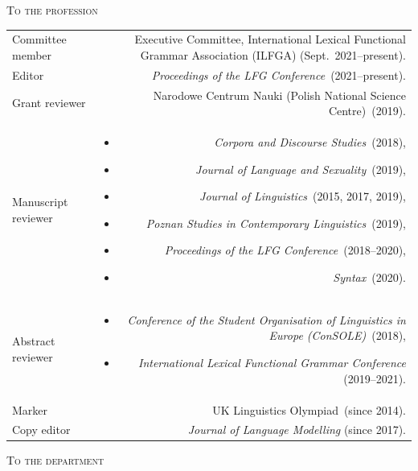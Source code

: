\documentclass[11pt,a4paper]{article}
\makeatletter
\newlength{\rulelength}%
\newenvironment{cvsection}{%
  \setlength{\extrarowheight}{0.70ex}
  \begin{longtable}[l]{@{} L R @{}}
}{%
  \end{longtable}
}
\newlength{\squish}
\newenvironment{reviewlist}
{%
\vspace*{\squish}%
\begin{itemize}[noitemsep,label={},nosep,left=0pt .. \parindent]%
}
{%
\end{itemize}
}
\newcommand{\Label}[1]{%
\textnormal{#1}%
}
\newcommand{\cvsubhead}[1]{\noindent\hspace*{\rulelength}\hspace*{9pt} \textsc{#1}\vspace*{0.25\baselineskip}}
\makeatother
\begin{document}
\cvsubhead{To the profession}
\begin{cvsection}
  \Label{Committee member} & Executive Committee, International Lexical Functional Grammar Association (ILFGA) (Sept.~2021--present).\\
  \Label{Editor} & \textit{Proceedings of the LFG Conference}~(2021--present).\\
\Label{Grant reviewer} &
                    Narodowe Centrum Nauki (Polish National Science Centre)~(2019).\\
\Label{Manuscript reviewer} &
                \begin{reviewlist}
                \item \textit{Corpora and Discourse Studies}~(2018),
                \item \textit{Journal of Language and Sexuality}~(2019),
                \item \textit{Journal of Linguistics}~(2015, 2017, 2019),
                \item \textit{Poznan Studies in Contemporary Linguistics}~(2019),
                \item \textit{Proceedings of the LFG Conference}~(2018--2020),
                \item  \textit{Syntax}~(2020).
                \end{reviewlist}
                 \\[\squish]
\Label{Abstract reviewer}   &
                \begin{reviewlist}
                \item \textit{Conference of the Student Organisation of Linguistics in Europe (ConSOLE)}~(2018),
                \item \textit{International Lexical Functional Grammar Conference} (2019--2021).
                \end{reviewlist}
                \\[\squish]
\Label{Marker}      & UK Linguistics Olympiad~(since 2014).\\
\Label{Copy editor} & \textit{Journal of Language Modelling} (since 2017).
\end{cvsection}
\vspace{0.2\squish}
\cvsubhead{To the department}
\end{document}
